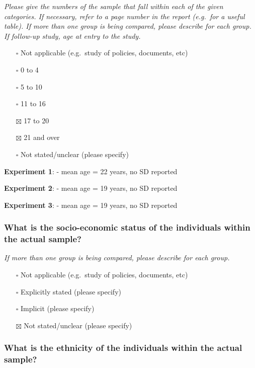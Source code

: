 \documentclass[
  doc, a4paper]{apa7}
\providecommand{\tightlist}{%
  \setlength{\itemsep}{0pt}\setlength{\parskip}{0pt}}
\begin{document}
\emph{Please give the numbers of the sample that fall within each of the given categories. If necessary, refer to a page number in the report (e.g.~for a useful table). If more than one group is being compared, please describe for each group. If follow-up study, age at entry to the study.}

\begin{itemize}
\tightlist
\item[$\square$]
  Not applicable (e.g.~study of policies, documents, etc)
\item[$\square$]
  0 to 4
\item[$\square$]
  5 to 10
\item[$\square$]
  11 to 16
\item[$\boxtimes$]
  17 to 20
\item[$\boxtimes$]
  21 and over
\item[$\square$]
  Not stated/unclear (please specify)
\end{itemize}

\textbf{Experiment 1}:
- mean age = 22 years, no SD reported

\textbf{Experiment 2}:
- mean age = 19 years, no SD reported

\textbf{Experiment 3}:
- mean age = 19 years, no SD reported

\subsubsection{What is the socio-economic status of the individuals within the actual sample?}\label{what-is-the-socio-economic-status-of-the-individuals-within-the-actual-sample}

\emph{If more than one group is being compared, please describe for each group.}

\begin{itemize}
\tightlist
\item[$\square$]
  Not applicable (e.g.~study of policies, documents, etc)
\item[$\square$]
  Explicitly stated (please specify)
\item[$\square$]
  Implicit (please specify)
\item[$\boxtimes$]
  Not stated/unclear (please specify)
\end{itemize}

\subsubsection{What is the ethnicity of the individuals within the actual sample?}\label{what-is-the-ethnicity-of-the-individuals-within-the-actual-sample}
\end{document}
